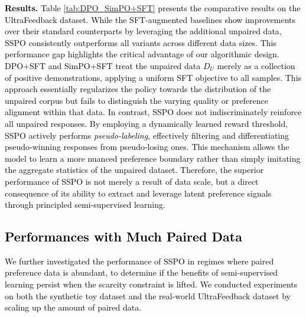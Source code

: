\documentclass{article} %
\newcommand\rebuttal[1]{\textcolor{black}{#1}}
\begin{document}
\noindent \rebuttal{\textbf{Results.} Table \ref{tab:DPO_SimPO+SFT} presents the comparative results on the UltraFeedback dataset. While the SFT-augmented baselines show improvements over their standard counterparts by leveraging the additional unpaired data, SSPO consistently outperforms all variants across different data sizes. This performance gap highlights the critical advantage of our algorithmic design. DPO+SFT and SimPO+SFT treat the unpaired data $D_U$ merely as a collection of positive demonstrations, applying a uniform SFT objective to all samples. This approach essentially regularizes the policy towards the distribution of the unpaired corpus but fails to distinguish the varying quality or preference alignment within that data. In contrast, SSPO does not indiscriminately reinforce all unpaired responses. By employing a dynamically learned reward threshold, SSPO actively performs \textit{pseudo-labeling}, effectively filtering and differentiating pseudo-winning responses from pseudo-losing ones. This mechanism allows the model to learn a more nuanced preference boundary rather than simply imitating the aggregate statistics of the unpaired dataset. Therefore, the superior performance of SSPO is not merely a result of data scale, but a direct consequence of its ability to extract and leverage latent preference signals through principled semi-supervised learning.}


\subsection{\rebuttal{Performances with Much Paired Data}}

\rebuttal{We further investigated the performance of SSPO in regimes where paired preference data is abundant, to determine if the benefits of semi-supervised learning persist when the scarcity constraint is lifted. We conducted experiments on both the synthetic toy dataset and the real-world UltraFeedback dataset by scaling up the amount of paired data.}
\end{document}
